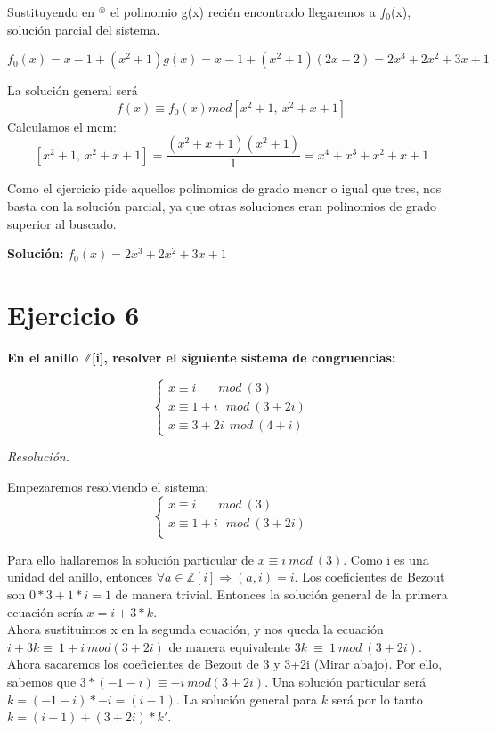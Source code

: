 \documentclass[11pt, a4paper, titlepage]{article}
\begin{document}
Sustituyendo en $^\circledast$ el polinomio g(x) recién encontrado llegaremos a $f_0$(x), solución parcial del sistema. 

$$f_0(x) = x-1 + (x^2+1)g(x) = x-1 + (x^2+1)(2x+2) = 2x^3+2x^2+3x+1$$

La solución general será $$f(x) \equiv f_0(x) mod[x^2+1,\ x^2+x+1]$$
Calculamos el mcm:
\[
	[x^2+1,\ x^2+x+1] = \frac{(x^2+x+1)(x^2+1)}{1} =x^4+x^3+x^2+x+1
\]

Como el ejercicio pide aquellos polinomios de grado menor o igual que tres, nos basta con la solución parcial, ya que otras soluciones eran polinomios de grado superior al buscado.

\textbf{Solución:} $f_0(x) = 2x^3+2x^2+3x+1$


\section{\LARGE{Ejercicio 6}}\textbf{
En el anillo $\mathbb{Z}$[i], resolver el siguiente sistema de congruencias:} 

\[
	\begin{cases}
	x \equiv i\ \ \ \ \ \ \ \ mod\ (3)\\
	x \equiv 1+i \ \ \ mod\ (3+2i)\\
	x \equiv 3+2i \ \ mod\ (4+i)
\end{cases}
\]

\emph{Resolución. \\ }

Empezaremos resolviendo el sistema: 
\[
	\begin{cases}
	x \equiv i\ \ \ \ \ \ \ \ mod\ (3)\\
	x \equiv 1+i \ \ \ mod\ (3+2i)\\
\end{cases}
\]

 Para ello hallaremos la solución particular de $x \equiv i\ mod\ (3)$. Como i es una unidad del anillo, entonces $\forall a \in \mathbb{Z}[i] \Rightarrow (a,i) = i.$ Los coeficientes de Bezout son $0*3 + 1*i = 1$ de manera trivial. Entonces la solución general de la primera ecuación sería $x = i + 3*k$. \\
 
 Ahora sustituimos x en la segunda ecuación, y nos queda la ecuación $i + 3k \equiv\ 1 +i\ mod (3+2i) $ de manera equivalente $3k\ \equiv\ 1\ mod\ (3+2i)$. Ahora sacaremos los coeficientes de Bezout de 3 y 3+2i (Mirar abajo). Por ello, sabemos que $3*(-1-i) \equiv -i\ mod (3+2i) $. Una solución particular será $k=(-1-i)*-i=(i-1)$. La solución general para $k$ será por lo tanto $k = (i-1) + (3+2i)*k'$. \\
 
\end{document}
